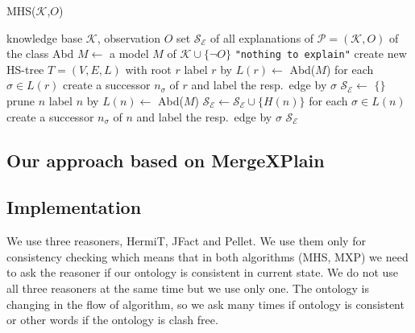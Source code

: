 \documentclass[12pt,a4paper]{article}
\begin{document}
\begin{algorithm}[H] 
	\footnotesize
	\caption{MHS($\mathcal{K}$,$O$)}
	\label{alg:mhs}
	\begin{algorithmic}[1]
		\Require knowledge base $\mathcal{K}$, observation $O$
		\Ensure set $\mathcal{S}_{\mathcal{E}}$ of all explanations of $\mathcal{P}=(\mathcal{K},O)$ of the class Abd
		\State $M \gets$ a model $M$ of $\mathcal{K} \cup \{\neg O\}$
		\label{soal:ta_init}
		\State \Return \texttt{"nothing to explain"} %
		\label{soal:nte}
		\EndIf %
		\label{soal:init:e}
		\State create new HS-tree $T=(V,E,L)$ with root $r$ %
		\label{soal:root:b}
		\State label $r$ by $L(r) \gets$ Abd($M$)
		\label{soal:r-label}
		\State for each $\sigma\in L(r)$ create a successor $n_\sigma$ of $r$
		and label the resp.\ edge by $\sigma$ %
		\label{soal:root:e}
		\State $\mathcal{S}_{\mathcal{E}} \gets$ $\{\}$ %
		\label{soal:SE:init}
		\label{soal:loop:b}
		\label{soal:prune:b}
		\State prune $n$
		\label{soal:prune:e}
		\label{soal:ta}
		\State label $n$ by $L(n) \gets$  Abd($M$) 
		\Else %
		\State $\mathcal{S}_\mathcal{E} \gets \mathcal{S}_\mathcal{E} \cup \{H(n)\}$ 
		\EndIf
		\State for each $\sigma\in L(n)$ create a successor $n_\sigma$ of $n$
		and label the resp.\ edge by $\sigma$ %
		\label{soal:modproc:e}
		\EndWhile
		\label{soal:loop:e}
		\label{soal:output}
		\State \Return $\mathcal{S}_\mathcal{E}$
	\end{algorithmic}
\end{algorithm}

\subsection{Our approach based on MergeXPlain}

\subsection{Implementation}
We use three reasoners, HermiT, JFact and Pellet. We use them only for consistency checking which means that in both algorithms (MHS, MXP) we need to ask the reasoner if our ontology is consistent in current state. We do not use all three reasoners at the same time but we use only one. The ontology is changing in the flow of algorithm, so we ask many times if ontology is consistent or other words if the ontology is clash free.
\end{document}
